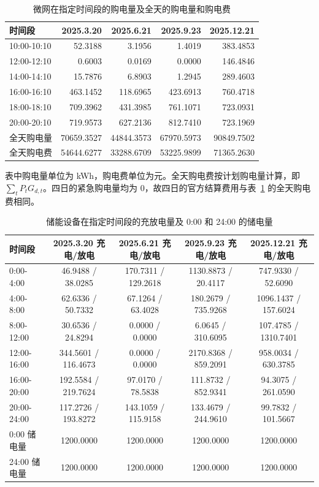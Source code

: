 \begin{table}[htbp]
\centering
\caption{微网在指定时间段的购电量及全天的购电量和购电费}
\label{tab:purchase2}
\begin{tabular}{lrrrr}
\toprule
时间段 & 2025.3.20 & 2025.6.21 & 2025.9.23 & 2025.12.21 \\
\midrule
10:00-10:10 & 52.3188 & 3.1956 & 1.4019 & 383.4853 \\
12:00-12:10 & 0.6003 & 0.0169 & 0.0000 & 146.4846 \\
14:00-14:10 & 15.7876 & 6.8903 & 1.2945 & 289.4603 \\
16:00-16:10 & 463.1452 & 118.6965 & 423.6913 & 760.4718 \\
18:00-18:10 & 709.3962 & 431.3985 & 761.1071 & 723.0931 \\
20:00-20:10 & 719.9573 & 627.2136 & 812.7410 & 723.1969 \\
全天购电量 & 70659.3527 & 44844.3573 & 67970.5973 & 90849.7502 \\
全天购电费 & 54644.6277 & 33288.6709 & 53225.9899 & 71365.2630 \\
\bottomrule
\end{tabular}
\end{table}

表中购电量单位为 kWh，购电费单位为元。全天购电费按计划购电量计算，即 $\sum_t P_tG_{d,t}$。四日的紧急购电量均为 $0$，故四日的官方结算费用与表~\ref{tab:purchase2} 的全天购电费相同。

\begin{table}[htbp]
\centering
\caption{储能设备在指定时间段的充放电量及 0:00 和 24:00 的储电量}
\label{tab:storage2}
\small
\setlength{\tabcolsep}{4pt}
\renewcommand{\arraystretch}{1.2}
\begin{tabular}{lcccc}
\toprule
时间段 & 2025.3.20 充电/放电 & 2025.6.21 充电/放电 & 2025.9.23 充电/放电 & 2025.12.21 充电/放电 \\
\midrule
0:00-4:00 & 46.9488 / 38.0285 & 170.7311 / 129.2618 & 1130.8873 / 20.4117 & 747.9330 / 52.6090 \\
4:00-8:00 & 62.6336 / 50.7332 & 67.1264 / 63.4028 & 180.2679 / 735.9268 & 1096.1437 / 157.6024 \\
8:00-12:00 & 30.6536 / 24.8294 & 0.0000 / 0.0000 & 6.0645 / 310.6095 & 107.4785 / 1310.7401 \\
12:00-16:00 & 344.5601 / 116.4673 & 0.0000 / 0.0000 & 2170.8368 / 859.2091 & 958.0034 / 630.3785 \\
16:00-20:00 & 192.5584 / 219.7624 & 97.0170 / 78.5838 & 111.8732 / 852.9341 & 94.3075 / 261.0590 \\
20:00-24:00 & 117.2726 / 193.8272 & 143.1059 / 115.9158 & 133.4679 / 244.9610 & 99.7832 / 101.5667 \\
0:00 储电量 & 1200.0000 & 1200.0000 & 1200.0000 & 1200.0000 \\
24:00 储电量 & 1200.0000 & 1200.0000 & 1200.0000 & 1200.0000 \\
\bottomrule
\end{tabular}
\end{table}

